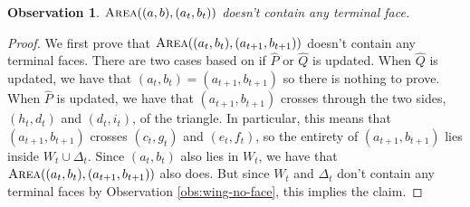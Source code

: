 \documentclass[11pt]{article}
\newtheorem{observation}[theorem]{Observation}
\begin{document}
\begin{observation}
    $\textsc{Area}((a,b),(a_t,b_t))$ doesn't contain any terminal face.
\end{observation}
\begin{proof}
    We first prove that $\textsc{Area}((a_t,b_t),(a_{t+1},b_{t+1}))$ doesn't contain any terminal faces. There are two cases based on if $\hat P$ or $\hat Q$ is updated. When $\hat{Q}$ is updated, we have that $(a_t,b_t)=(a_{t+1},b_{t+1})$ so there is nothing to prove. When $\hat P$ is updated, we have that $(a_{t+1},b_{t+1})$ crosses through the two sides, $(h_t,d_t)$ and $(d_t,i_t)$, of the triangle. In particular, this means that $(a_{t+1},b_{t+1})$ crosses $(c_t,g_t)$ and $(e_t,f_t)$, so the entirety of $(a_{t+1},b_{t+1})$ lies inside $W_t\cup\Delta_t$. Since $(a_t,b_t)$ also lies in $W_t$, we have that $\textsc{Area}((a_t,b_t),(a_{t+1},b_{t+1}))$ also does. But since $W_t$ and $\Delta_t$ don't contain any terminal faces by Observation \ref{obs:wing-no-face}, this implies the claim.


\end{proof}
\end{document}
